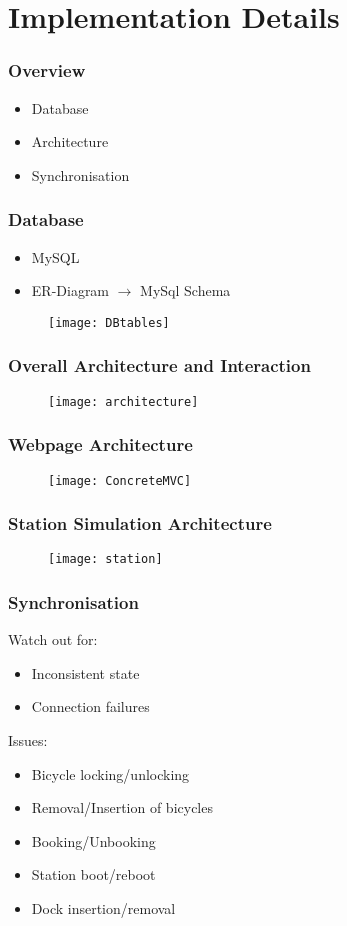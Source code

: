 \section{Implementation Details}

\begin{frame}
\frametitle{Overview}
\begin{itemize}
\item Database
\item Architecture
\item Synchronisation
\end{itemize}
\end{frame}

\begin{frame}
\frametitle{Database}
\begin{itemize}
	\item MySQL
	\item ER-Diagram $\rightarrow$ MySql Schema
\end{itemize}
	\begin{figure}
		\texttt{[image: DBtables]}
	\end{figure}
\end{frame}


\begin{frame}
	\frametitle{Overall Architecture and Interaction}
		\begin{figure}
			\texttt{[image: architecture]}
		\end{figure}
\end{frame}

\begin{frame}
	\frametitle{Webpage Architecture}
	\begin{figure}
		\texttt{[image: ConcreteMVC]}
	\end{figure}
\end{frame}

\begin{frame}
	\frametitle{Station Simulation Architecture}
		\begin{figure}
			\texttt{[image: station]}
		\end{figure}
\end{frame}

\begin{frame}
	\frametitle{Synchronisation}
	Watch out for:
	\begin{itemize}
		\item Inconsistent state
		\item Connection failures
	\end{itemize}
	\pause
	Issues:
	\begin{itemize}
		\item Bicycle locking/unlocking
		\item Removal/Insertion of bicycles
		\item Booking/Unbooking
		\item Station boot/reboot
		\item Dock insertion/removal
	\end{itemize}
\end{frame}